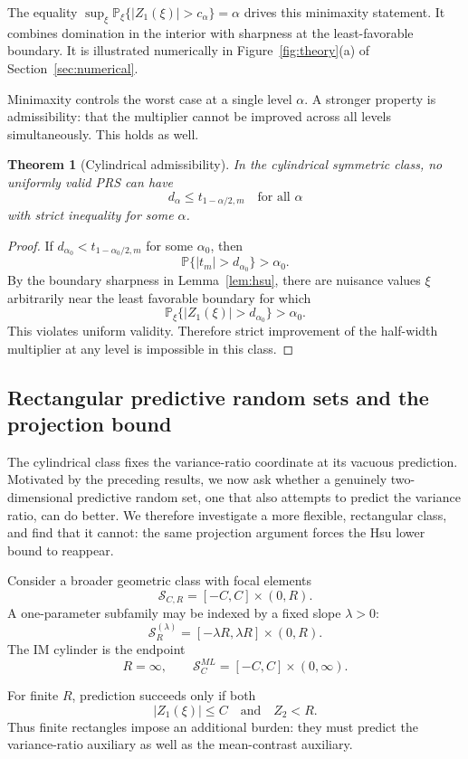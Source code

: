 \documentclass[12pt]{article}
\newtheorem{theorem}{Theorem}
\newcommand{\Prb}{\mathbb P}
\begin{document}
The equality \(\sup_\xi\Prb_\xi\{|Z_1(\xi)|>c_\alpha\}=\alpha\) drives this
minimaxity statement.  It combines domination in the interior with sharpness at
the least-favorable boundary.  It is illustrated numerically in
Figure~\ref{fig:theory}(a) of Section~\ref{sec:numerical}.

Minimaxity controls the worst case at a single level \(\alpha\).  A stronger
property is admissibility: that the multiplier cannot be improved across all
levels simultaneously.  This holds as well.

\begin{theorem}[Cylindrical admissibility]
In the cylindrical symmetric class, no uniformly valid PRS can have
\[
d_\alpha\leq t_{1-\alpha/2,m}\quad\text{for all }\alpha
\]
with strict inequality for some \(\alpha\).
\end{theorem}

\begin{proof}
If \(d_{\alpha_0}<t_{1-\alpha_0/2,m}\) for some \(\alpha_0\), then
\[
\Prb\{|t_m|>d_{\alpha_0}\}>\alpha_0.
\]
By the boundary sharpness in Lemma~\ref{lem:hsu}, there are nuisance values
\(\xi\) arbitrarily near the least favorable boundary for which
\[
\Prb_\xi\{|Z_1(\xi)|>d_{\alpha_0}\}>\alpha_0.
\]
This violates uniform validity.  Therefore strict improvement of the
half-width multiplier at any level is impossible in this class.
\end{proof}

\subsection{Rectangular predictive random sets and the projection bound}

The cylindrical class fixes the variance-ratio coordinate at its vacuous
prediction.  Motivated by the preceding results, we now ask whether a genuinely
two-dimensional predictive random set, one that also attempts to predict the
variance ratio, can do better.  We therefore investigate a more flexible,
rectangular class, and find that it cannot: the same projection argument forces
the Hsu lower bound to reappear.

Consider a broader geometric class with focal elements
\[
\mathcal S_{C,R}=[-C,C]\times(0,R).
\]
A one-parameter subfamily may be indexed by a fixed slope \(\lambda>0\):
\[
\mathcal S_R^{(\lambda)}=[-\lambda R,\lambda R]\times(0,R).
\]
The IM cylinder is the endpoint
\[
R=\infty,
\qquad
\mathcal S_C^{ML}=[-C,C]\times(0,\infty).
\]

For finite \(R\), prediction succeeds only if both
\[
|Z_1(\xi)|\leq C
\quad\text{and}\quad
Z_2<R.
\]
Thus finite rectangles impose an additional burden: they must predict the
variance-ratio auxiliary as well as the mean-contrast auxiliary.
\end{document}
